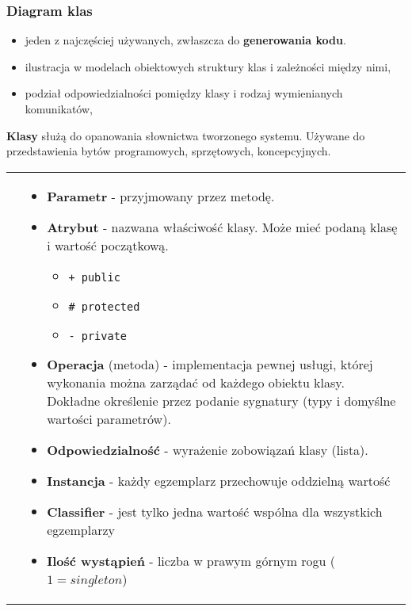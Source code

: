 \documentclass[../main.tex]{subfiles}
\begin{document}
    \subsubsection{Diagram klas}
    \begin{itemize}
        \item jeden z najczęściej używanych, zwłaszcza do \textbf{generowania kodu}.
        \item ilustracja w modelach obiektowych struktury klas i zależności między nimi,
        \item podział odpowiedzialności pomiędzy klasy i rodzaj wymienianych komunikatów,
    \end{itemize}

    \textbf{Klasy} służą do opanowania słownictwa tworzonego systemu. Używane do przedstawienia bytów programowych, sprzętowych,
    koncepcyjnych.


    \begin{table}[H]
        \begin{center}
            \begin{tabular}{ c p{8cm} }
                \raisebox{-\totalheight}{\texttt{[image: diagram\_klasy.png]}}
                &
                \begin{itemize}
                    \item \textbf{Parametr} - przyjmowany przez metodę.
                    \item \textbf{Atrybut} - nazwana właściwość klasy. Może mieć podaną klasę i wartość początkową.
                    \begin{itemize}
                        \item \texttt{+  public}
                        \item \texttt{\# protected}
                        \item \texttt{- private}
                    \end{itemize}
                    \item \textbf{Operacja} (metoda) - implementacja pewnej usługi, której wykonania można zarządać
                    od każdego obiektu klasy. Dokładne określenie przez podanie sygnatury (typy i domyślne wartości parametrów).
                    \item \textbf{Odpowiedzialność} - wyrażenie zobowiązań klasy (lista).

                    \item \textbf{Instancja} - każdy egzemplarz przechowuje oddzielną wartość
                    \item \textbf{Classifier} - jest tylko jedna wartość wspólna dla wszystkich egzemplarzy
                    \item \textbf{Ilość wystąpień} - liczba w prawym górnym rogu ($1 = singleton$)
                \end{itemize}
                \\
            \end{tabular}
        \end{center}
    \end{table}
\end{document}
